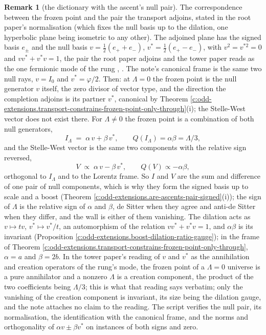 \documentclass[11pt]{article}
\theoremstyle{definition}
\newtheorem{remark}[theorem]{Remark}
\theoremstyle{plain}
\newcommand{\changedmark}[2]{\marginpar{\raggedright\scriptsize\color{#1}#2}}
\begin{document}
\begin{remark}[the dictionary with the ascent's null pair]\label{c:note.odd-extensions.dictionary-ascents-null-pair}
\changedmark{gray}{reworded}
The correspondence between the frozen point and the pair the transport adjoins, stated in the root paper's normalisation (which fixes the null basis up to the dilation, one hyperbolic plane being isometric to any other). The adjoined plane has the signed basis $e_{\pm}$ and the null basis $v = \tfrac12(e_{+} + e_{-})$, $v^{*} = \tfrac12(e_{+} - e_{-})$, with $v^{2} = v^{*2} = 0$ and $vv^{*} + v^{*}v = 1$, the pair the root paper adjoins and the tower paper reads as the one fermionic mode of the rung \cite[\S 2.2]{ButlerT1}, \cite[Prop.~4.1, Thm.~4.2]{ButlerT3}. The note's canonical frame is the same two null rays, $v = I_{0}$ and $v^{*} = \varphi/2$. Then: at $\Lambda = 0$ the frozen point is the null generator $v$ itself, the zero divisor of vector type, and the direction the completion adjoins is its partner $v^{*}$, canonical by Theorem \ref{c:odd-extensions.transport-constrains-frozen-point-only-through}(i); the Stelle-West vector does not exist there. For $\Lambda \neq 0$ the frozen point is a combination of both null generators,
\[
I_{\Lambda} \;=\; \alpha\, v + \beta\, v^{*}, \qquad Q(I_{\Lambda}) = \alpha\beta = \Lambda/3 ,
\]
and the Stelle-West vector is the same two components with the relative sign reversed,
\[
V \;\propto\; \alpha\, v - \beta\, v^{*}, \qquad Q(V) \propto -\alpha\beta ,
\]
orthogonal to $I_{\Lambda}$ and to the Lorentz frame. So $I$ and $V$ are the sum and difference of one pair of null components, which is why they form the signed basis up to scale and a boost (Theorem \ref{c:odd-extensions.are-ascents-pair-signed}(i)); the sign of $\Lambda$ is the relative sign of $\alpha$ and $\beta$, de Sitter when they agree and anti-de Sitter when they differ, and the wall is either of them vanishing. The dilation acts as $v \mapsto tv$, $v^{*} \mapsto v^{*}/t$, an automorphism of the relation $vv^{*} + v^{*}v = 1$, and $\alpha\beta$ is its invariant (Proposition \ref{c:odd-extensions.boost-dilation-ratio-gauge}); in the frame of Theorem \ref{c:odd-extensions.transport-constrains-frozen-point-only-through}, $\alpha = a$ and $\beta = 2b$. In the tower paper's reading of $v$ and $v^{*}$ as the annihilation and creation operators of the rung's mode, the frozen point of a $\Lambda = 0$ universe is a pure annihilator and a nonzero $\Lambda$ is a creation component, the product of the two coefficients being $\Lambda/3$; this is what that reading says verbatim; only the vanishing of the creation component is invariant, its size being the dilation gauge, and the note attaches no claim to the reading. The script verifies the null pair, its normalisation, the identification with the canonical frame, and the norms and orthogonality of $\alpha v \pm \beta v^{*}$ on instances of both signs and zero.
\end{remark}
\end{document}

